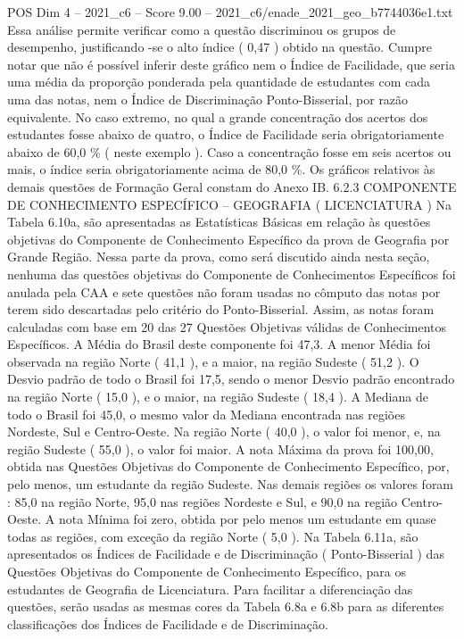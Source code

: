 \begin{textsample}{POS Dim 4 – 2021\_c6 – Score 9.00 – 2021\_c6/enade\_2021\_geo\_b7744036e1.txt}
Essa análise permite verificar como a questão discriminou os grupos de desempenho, justificando -se o alto índice ( 0,47 ) obtido na questão.
Cumpre notar que não é possível inferir deste gráfico nem o Índice de Facilidade, que seria uma média da proporção ponderada pela quantidade de estudantes com cada uma das notas, nem o Índice de Discriminação Ponto-Bisserial, por razão equivalente.
No caso extremo, no qual a grande concentração dos acertos dos estudantes fosse abaixo de quatro, o Índice de Facilidade seria obrigatoriamente abaixo de 60,0 \% ( neste exemplo ).
Caso a concentração fosse em seis acertos ou mais, o índice seria obrigatoriamente acima de 80,0 \%.
Os gráficos relativos às demais questões de Formação Geral constam do Anexo IB. 6.2.3 COMPONENTE DE CONHECIMENTO ESPECÍFICO – GEOGRAFIA ( LICENCIATURA ) Na Tabela 6.10a, são apresentadas as Estatísticas Básicas em relação às questões objetivas do Componente de Conhecimento Específico da prova de Geografia por Grande Região.
Nessa parte da prova, como será discutido ainda nesta seção, nenhuma das questões objetivas do Componente de Conhecimentos Específicos foi anulada pela CAA e sete questões não foram usadas no cômputo das notas por terem sido descartadas pelo critério do Ponto-Bisserial.
Assim, as notas foram calculadas com base em 20 das 27 Questões Objetivas válidas de Conhecimentos Específicos.
A Média do Brasil deste componente foi 47,3.
A menor Média foi observada na região Norte ( 41,1 ), e a maior, na região Sudeste ( 51,2 ).
O Desvio padrão de todo o Brasil foi 17,5, sendo o menor Desvio padrão encontrado na região Norte ( 15,0 ), e o maior, na região Sudeste ( 18,4 ).
A Mediana de todo o Brasil foi 45,0, o mesmo valor da Mediana encontrada nas regiões Nordeste, Sul e Centro-Oeste.
Na região Norte ( 40,0 ), o valor foi menor, e, na região Sudeste ( 55,0 ), o valor foi maior.
A nota Máxima da prova foi 100,00, obtida nas Questões Objetivas do Componente de Conhecimento Específico, por, pelo menos, um estudante da região Sudeste.
Nas demais regiões os valores foram : 85,0 na região Norte, 95,0 nas regiões Nordeste e Sul, e 90,0 na região Centro-Oeste.
A nota Mínima foi zero, obtida por pelo menos um estudante em quase todas as regiões, com exceção da região Norte ( 5,0 ).
Na Tabela 6.11a, são apresentados os Índices de Facilidade e de Discriminação ( Ponto-Bisserial ) das Questões Objetivas do Componente de Conhecimento Específico, para os estudantes de Geografia de Licenciatura.
Para facilitar a diferenciação das questões, serão usadas as mesmas cores da Tabela 6.8a e 6.8b para as diferentes classificações dos Índices de Facilidade e de Discriminação.

\end{textsample}
